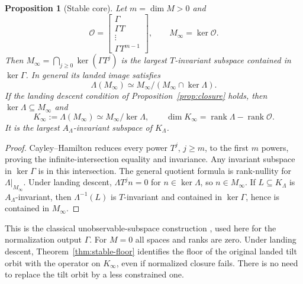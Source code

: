 \documentclass[11pt]{amsart}
\newtheorem{proposition}[theorem]{Proposition}
\theoremstyle{definition}
\newcommand{\rankp}{\operatorname{rank}}
\begin{document}
\begin{proposition}[Stable core]\label{prop:stable}
Let \(m=\dim M>0\) and
\[
\mathcal O=
\begin{bmatrix}\Gamma\\\Gamma T\\ \vdots\\\Gamma T^{m-1}\end{bmatrix},
\qquad M_\infty=\ker\mathcal O.
\]
Then \(M_\infty=\bigcap_{j\ge0}\ker(\Gamma T^j)\) is the largest \(T\)-invariant
subspace contained in \(\ker\Gamma\). In general its landed image satisfies
\[
\Lambda(M_\infty)\simeq
M_\infty/(M_\infty\cap\ker\Lambda).
\]
If the landing descent condition of Proposition~\ref{prop:closure} holds, then
\(\ker\Lambda\subseteq M_\infty\) and
\[
K_\infty:=\Lambda(M_\infty)\simeq M_\infty/\ker\Lambda,\qquad
\dim K_\infty=\rankp\Lambda-\rankp\mathcal O.
\]
It is the largest \(A_\Lambda\)-invariant subspace of \(K_\Lambda\).
\end{proposition}
\begin{proof}
Cayley--Hamilton reduces every power \(T^j\), \(j\ge m\), to the first \(m\)
powers, proving the infinite-intersection equality and invariance. Any invariant
subspace in \(\ker\Gamma\) is in this intersection. The general quotient formula
is rank-nullity for \(\Lambda|_{M_\infty}\). Under landing descent,
\(\Lambda T^j n=0\) for \(n\in\ker\Lambda\), so \(n\in M_\infty\).
If \(L\subseteq K_\Lambda\) is \(A_\Lambda\)-invariant, then \(\Lambda^{-1}(L)\)
is \(T\)-invariant and contained in \(\ker\Gamma\), hence is contained in \(M_\infty\).
\end{proof}

This is the classical unobservable-subspace construction
\cite{Kalman1963,BoydLall}, used here for the normalization output \(\Gamma\).
For \(M=0\) all spaces and ranks are zero. Under landing descent,
Theorem~\ref{thm:stable-floor} identifies the floor of the original landed tilt
orbit with the operator on \(K_\infty\), even if normalized closure fails.
There is no need to replace the tilt orbit by a less constrained one.
\end{document}
